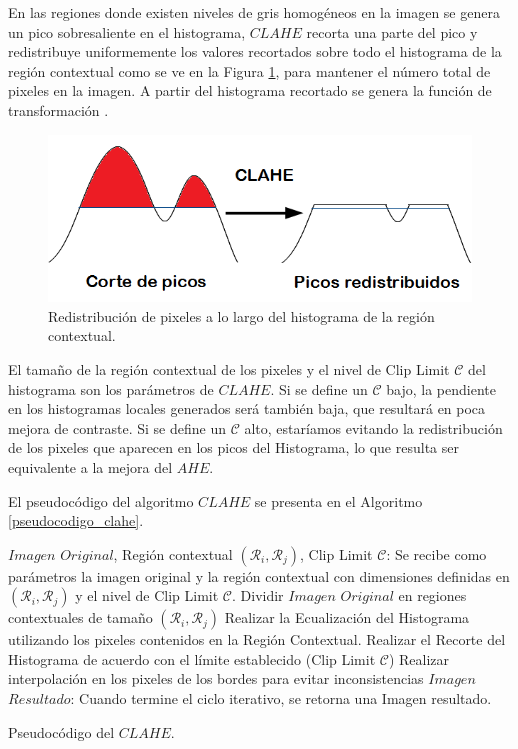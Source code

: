 En las regiones donde existen niveles de gris homogéneos en la imagen se genera un pico sobresaliente en el histograma, $CLAHE$ recorta una parte del pico y redistribuye uniformemente los valores recortados sobre todo el histograma de la región contextual como se ve en la Figura \ref{clahe_recorte_pico}, para mantener el número total de pixeles en la imagen. A partir del histograma recortado se genera la función de transformación \cite{Zuiderveld1994,byong2013}.

\begin{figure}[H]
  \begin{center}
    \leavevmode
    \includegraphics[width=12cm] {distribucion_pixel_clahe.png}
    \caption{Redistribución de pixeles a lo largo del histograma de la región contextual.}
    \label{clahe_recorte_pico}
  \end{center}
\end{figure}

El tamaño de la región contextual de los pixeles y el nivel de Clip Limit $\mathscr{C}$ del histograma son los parámetros de $CLAHE$. Si se define un $\mathscr{C}$ bajo, la pendiente en los histogramas locales generados será también baja, que resultará en poca mejora de contraste. Si se define un $\mathscr{C}$ alto, estaríamos evitando la redistribución de los pixeles que aparecen en los picos del Histograma, lo que resulta ser equivalente a la mejora del $AHE$.

El pseudocódigo del algoritmo $CLAHE$ se presenta en el Algoritmo \ref{pseudocodigo_clahe}.

\begin{algorithm}
    \begin{algorithmic} [1]
    \REQUIRE $Imagen$ $Original$, Región contextual $(\mathcal{R}_i,\mathcal{R}_j)$, Clip Limit $\mathscr{C}$: Se recibe como parámetros la imagen original y la región contextual con dimensiones definidas en $(\mathcal{R}_i,\mathcal{R}_j)$ y el nivel de Clip Limit $\mathscr{C}$.
    \STATE Dividir $Imagen$ $Original$ en regiones contextuales de tamaño $(\mathcal{R}_i, \mathcal{R}_j) $
    \STATE Realizar la Ecualización del Histograma utilizando los pixeles contenidos en la Región Contextual.
    \STATE Realizar el Recorte del Histograma de acuerdo con el límite establecido (Clip Limit $\mathscr{C}$)
    \ENDFOR
    \STATE Realizar interpolación en los pixeles de los bordes para evitar inconsistencias
    \ENDFOR
    \RETURN $Imagen$ $Resultado$: Cuando termine el ciclo iterativo, se retorna una Imagen resultado.
    \end{algorithmic}
    \caption{Pseudocódigo del $CLAHE$.}
    \label{pseudocodigo_clahe}
\end{algorithm}\break

